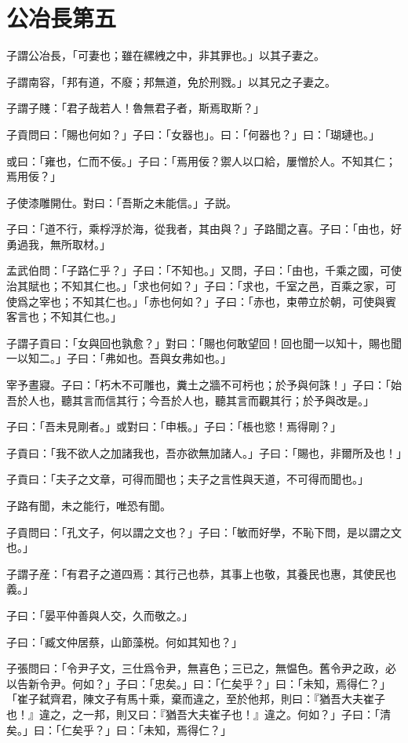 \section[公冶長第五]{公冶長第五}

子謂公冶長，「可妻也；雖在縲絏之中，非其罪也。」以其子妻之。

子謂南容，「邦有道，不廢；邦無道，免於刑戮。」以其兄之子妻之。

子謂子賤：「君子哉若人！魯無君子者，斯焉取斯？」

子貢問曰：「賜也何如？」子曰：「女器也」。曰：「何器也？」曰：「瑚璉也。」

或曰：「雍也，仁而不佞。」子曰：「焉用佞？禦人以口給，屢憎於人。不知其仁；焉用佞？」

子使漆雕開仕。對曰：「吾斯之未能信。」子説。

子曰：「道不行，乘桴浮於海，從我者，其由與？」子路聞之喜。子曰：「由也，好勇過我，無所取材。」

孟武伯問：「子路仁乎？」子曰：「不知也。」又問，子曰：「由也，千乘之國，可使治其賦也；不知其仁也。」「求也何如？」子曰：「求也，千室之邑，百乘之家，可使爲之宰也；不知其仁也。」「赤也何如？」子曰：「赤也，束帶立於朝，可使與賓客言也；不知其仁也。」

子謂子貢曰：「女與回也孰愈？」對曰：「賜也何敢望回！回也聞一以知十，賜也聞一以知二。」子曰：「弗如也。吾與女弗如也。」

宰予晝寢。子曰：「朽木不可雕也，糞土之牆不可杇也；於予與何誅！」子曰：「始吾於人也，聽其言而信其行；今吾於人也，聽其言而觀其行；於予與改是。」

子曰：「吾未見剛者。」或對曰：「申棖。」子曰：「棖也慾！焉得剛？」

子貢曰：「我不欲人之加諸我也，吾亦欲無加諸人。」子曰：「賜也，非爾所及也！」

子貢曰：「夫子之文章，可得而聞也；夫子之言性與天道，不可得而聞也。」

子路有聞，未之能行，唯恐有聞。

子貢問曰：「孔文子，何以謂之文也？」子曰：「敏而好學，不恥下問，是以謂之文也。」

子謂子産：「有君子之道四焉：其行己也恭，其事上也敬，其養民也惠，其使民也義。」

子曰：「晏平仲善與人交，久而敬之。」

子曰：「臧文仲居蔡，山節藻棁。何如其知也？」

子張問曰：「令尹子文，三仕爲令尹，無喜色；三已之，無愠色。舊令尹之政，必以告新令尹。何如？」子曰：「忠矣。」曰：「仁矣乎？」曰：「未知，焉得仁？」「崔子弑齊君，陳文子有馬十乘，棄而違之，至於他邦，則曰：『猶吾大夫崔子也！』違之，之一邦，則又曰：『猶吾大夫崔子也！』違之。何如？」子曰：「清矣。」曰：「仁矣乎？」曰：「未知，焉得仁？」

